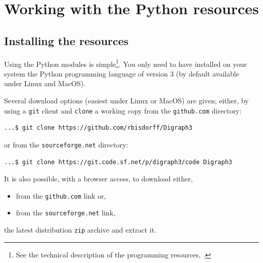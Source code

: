 %
%
%
\chapter{Working with the \Digraph Python resources}
\label{sec:1} %



\section{Installing the \Digraph resources}
\label{sec:1.1}

Using the \Digraph Python modules is simple\footnote{See the technical description of the \Digraph programming resources, \citet{BIS-2021b}.}. You only need to have installed on your system the Python programming language of version 3 (by default available under Linux and MacOS).

Several download options (easiest under Linux or MacOS) are given; either, by using a \texttt{git} client and \texttt{clone} a working copy from the \texttt{github.com} directory:
\begin{lstlisting}[language=sh, backgroundcolor=\color{White}, numbers=none]
  ...$ git clone https://github.com/rbisdorff/Digraph3
\end{lstlisting}
or from the \texttt{sourceforge.net} directory:
\begin{lstlisting}[language=sh,backgroundcolor=\color{White},numbers=none]
  ...$ git clone https://git.code.sf.net/p/digraph3/code Digraph3
\end{lstlisting}
It is also possible, with a browser access, to download either,
\begin{itemize}[nosep]
\item from the \texttt{github.\-com} link or,
\item from the \texttt{sourceforge.net} link,
\end{itemize}
the latest distribution \texttt{zip} archive and extract it.


